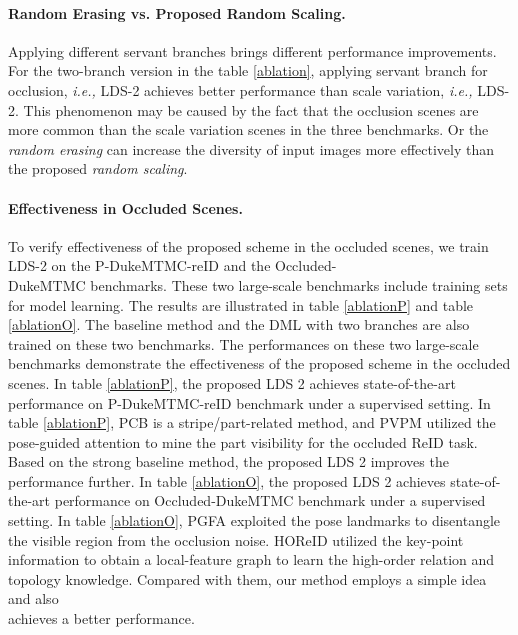 \documentclass[a4paper]{cas-dc}
\begin{document}
\paragraph{Random Erasing vs. Proposed Random Scaling.}
Applying different servant branches brings different performance improvements. For the two-branch version in the table \ref{ablation}, applying servant branch for occlusion, \textit{i.e., } LDS-2 achieves better performance than scale variation, \textit{i.e.,} LDS-2. This phenomenon may be caused by the fact that the occlusion scenes are more common than the scale variation scenes in the three benchmarks. Or the \textit{random erasing} can increase the diversity of input images more effectively than the proposed \textit{random scaling}.

\paragraph{Effectiveness in Occluded Scenes.}
To verify effectiveness of the proposed scheme in the occluded scenes, we train LDS-2 on the P-DukeMTMC-reID and the Occluded-\\DukeMTMC benchmarks. These two large-scale benchmarks include training sets for model learning. The results are illustrated in table \ref{ablationP} and table \ref{ablationO}. The baseline method and the DML with two branches are also trained on these two benchmarks. The performances on these two large-scale benchmarks demonstrate the effectiveness of the proposed scheme in the occluded scenes. In table \ref{ablationP}, the proposed LDS 2 achieves state-of-the-art performance on P-DukeMTMC-reID benchmark under a supervised setting. In table \ref{ablationP}, PCB \cite{RN191} is a stripe/part-related method, and PVPM \cite{RN472} utilized the pose-guided attention to mine the part visibility for the occluded ReID task. Based on the strong baseline method, the proposed LDS 2 improves the performance further. In table \ref{ablationO}, the proposed LDS 2 achieves state-of-the-art performance on Occluded-DukeMTMC benchmark under a supervised setting. In table \ref{ablationO}, PGFA \cite{RN291} exploited the pose landmarks to disentangle the visible region from the occlusion noise. HOReID \cite{RN467} utilized the key-point information to obtain a local-feature graph to learn the high-order relation and topology knowledge. Compared with them, our method employs a simple idea and also \\achieves a better performance.
\end{document}
